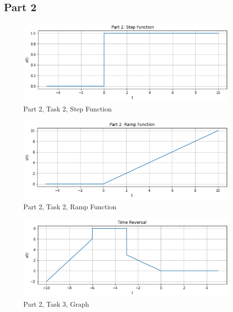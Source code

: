 \documentclass[12pt]{report}
\begin{document}
\subsection{Part 2} {
\begin{figure}[h!]
\begin{center}
\caption{Part 2, Task 2, Step Function}
\includegraphics[scale=0.55]{Part2Step.png}
\end{center}
\end{figure}

\begin{figure}[h!]
\begin{center}
\caption{Part 2, Task 2, Ramp Function}
\includegraphics[scale=0.65]{Part2Ramp.png}
\end{center}
\end{figure}

\begin{figure}[h!]
\begin{center}
\caption{Part 2, Task 3, Graph}
\includegraphics[scale=0.65]{Part2Task.png}
\end{center}
\end{figure}
}
\newpage
\end{document}
